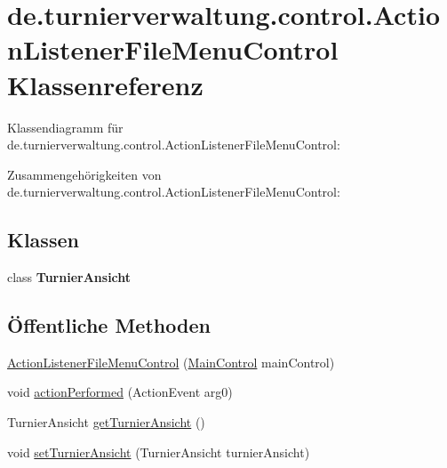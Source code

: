 \hypertarget{classde_1_1turnierverwaltung_1_1control_1_1_action_listener_file_menu_control}{}\section{de.\+turnierverwaltung.\+control.\+Action\+Listener\+File\+Menu\+Control Klassenreferenz}
\label{classde_1_1turnierverwaltung_1_1control_1_1_action_listener_file_menu_control}


Klassendiagramm für de.\+turnierverwaltung.\+control.\+Action\+Listener\+File\+Menu\+Control\+:


Zusammengehörigkeiten von de.\+turnierverwaltung.\+control.\+Action\+Listener\+File\+Menu\+Control\+:
\subsection*{Klassen}
\begin{DoxyCompactItemize}
\item 
class {\bfseries Turnier\+Ansicht}
\end{DoxyCompactItemize}
\subsection*{Öffentliche Methoden}
\begin{DoxyCompactItemize}
\item 
\hyperlink{classde_1_1turnierverwaltung_1_1control_1_1_action_listener_file_menu_control_ae423ea25c1b46b5caf73e869f2485e3b}{Action\+Listener\+File\+Menu\+Control} (\hyperlink{classde_1_1turnierverwaltung_1_1control_1_1_main_control}{Main\+Control} main\+Control)
\item 
void \hyperlink{classde_1_1turnierverwaltung_1_1control_1_1_action_listener_file_menu_control_a08e11510cc9fcff12dd9aefd50e56058}{action\+Performed} (Action\+Event arg0)
\item 
Turnier\+Ansicht \hyperlink{classde_1_1turnierverwaltung_1_1control_1_1_action_listener_file_menu_control_afa830a0028834268b2d444fc14fb3fc9}{get\+Turnier\+Ansicht} ()
\item 
void \hyperlink{classde_1_1turnierverwaltung_1_1control_1_1_action_listener_file_menu_control_a53455ea15fc6803b3b3a88ddd136c0a2}{set\+Turnier\+Ansicht} (Turnier\+Ansicht turnier\+Ansicht)
\end{DoxyCompactItemize}


